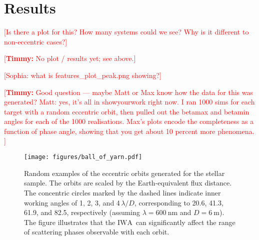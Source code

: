 \documentclass[
    usenatbib,
]{mnras}
\newcommand{\todo}[1]{\textcolor{red}{[#1]}}
\newcommand{\timmy}[1]{\textcolor{red}{[\textbf{Timmy:} #1]}} %
\newcommand{\IWA}{\ensuremath{\mathrm{IWA}}}
\begin{document}

\section{Results}




\todo{Is there a plot for this? How many systems could we see? Why is it different to non-eccentric cases?}

\timmy{No plot / results yet; see above.}

\todo{Sophia: what is features\_plot\_peak.png showing?}

\timmy{Good question --- maybe Matt or Max know how the data for this was generated? Matt: yes, it's all in showyourwork right now. I ran 1000 sims for each target with a random eccentric orbit, then pulled out the betamax and betamin angles for each of the 1000 realisations. Max's plots encode the completeness as a function of phase angle, showing that you get about 10 percent more phenomena. }

\begin{figure*}
    \centering
    \texttt{[image: figures/ball\_of\_yarn.pdf]}  
    \caption{
        Random examples of the eccentric orbits generated for the stellar sample.
        The orbits are scaled by the Earth-equivalent flux distance. 
        The concentric circles marked by the dashed lines indicate inner working angles of 1, 2, 3, and 4\,$\lambda / D$, corresponding to 20.6, 41.3, 61.9, and \SI{82.5}{\mas}, respectively (assuming $\lambda = \SI{600}{\nano\meter}$ and $D = \SI{6}{\meter}$).
        The figure illustrates that the \IWA\ can significantly affect the range of scattering phases observable with each orbit.
    }
    \label{fig:ball-o-yarn}
\end{figure*}
 
\end{document}
